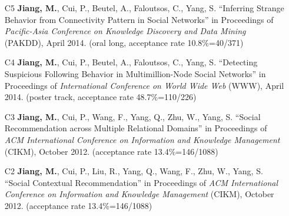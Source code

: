 \documentclass[10pt]{article}
\newenvironment{myindentpar}[1]%
{\begin{list}{}%
         {\setlength{\leftmargin}{#1}}%
         \item[]%
}
{\end{list}}
\newcounter{list}
\newcommand{\hide}[1]{}
\begin{document}
\begin{myindentpar}{0.00cm}
\begin{enumerate}[leftmargin=.5cm]
	\hide{\vspace{-0.1cm}\hspace{0.5cm}{\small \emph{I conceived the idea in consultation with Drs. Cui and Wang. I designed the study, completed the experiments, and wrote the paper.}}}

\item[C5] \textbf{Jiang, M.}, Cui, P., Beutel, A., Faloutsos, C., Yang, S. ``Inferring Strange Behavior from Connectivity Pattern in Social Networks'' in Proceedings of \emph{Pacific-Asia Conference on Knowledge Discovery and Data Mining} (PAKDD), April 2014. (oral long, acceptance rate 10.8\%=40/371)

	\hide{\vspace{-0.1cm}\hspace{0.5cm}{\small \emph{I conceived the idea, designed the study, did the experiments, and wrote the paper.}}}

\item[C4] \textbf{Jiang, M.}, Cui, P., Beutel, A., Faloutsos, C., Yang, S. ``Detecting Suspicious Following Behavior in Multimillion-Node Social Networks'' in Proceedings of \emph{International Conference on World Wide Web} (WWW), April 2014. (poster track, acceptance rate 48.7\%=110/226)

	\hide{\vspace{-0.1cm}\hspace{0.5cm}{\small \emph{I conceived the idea, designed the study, did the experiments, and wrote the paper.}}}

\item[C3] \textbf{Jiang, M.}, Cui, P., Wang, F., Yang, Q., Zhu, W., Yang, S. ``Social Recommendation across Multiple Relational Domains'' in Proceedings of \emph{ACM International Conference on Information and Knowledge Management} (CIKM), October 2012. (acceptance rate 13.4\%=146/1088)

	\hide{\vspace{-0.1cm}\hspace{0.5cm}{\small \emph{I conceived the idea in consultation with Dr. Wang. I designed the study, completed the experiments, and wrote the paper. Dr. Cui edited the paper.}}}

\item[C2] \textbf{Jiang, M.}, Cui, P., Liu, R., Yang, Q., Wang, F., Zhu, W., Yang, S. ``Social Contextual Recommendation'' in Proceedings of \emph{ACM International Conference on Information and Knowledge Management} (CIKM), October 2012. (acceptance rate 13.4\%=146/1088)


\end{enumerate}
\end{myindentpar}
\end{document}
